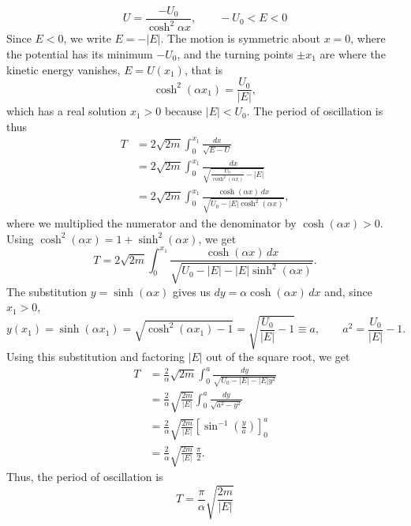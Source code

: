 \begin{subproblem}
{
\begin{equation*}
    U = \frac{-U_0}{\cosh^2{\alpha x}}, \qquad -U_0 < E < 0
\end{equation*}
}
{
Since $E<0$, we write $E=-|E|$. The motion is symmetric about $x=0$, where the potential has its minimum $-U_0$, and the turning points $\pm x_1$ are where the kinetic energy vanishes, $E = U(x_1)$, that is
\begin{equation*}
    \cosh^2{(\alpha x_1)} = \frac{U_0}{|E|},
\end{equation*}
which has a real solution $x_1>0$ because $|E|<U_0$. The period of oscillation is thus
\begin{align*}
    T &= 2\sqrt{2m} \int_0^{x_1}\frac{dx}{\sqrt{E-U}} \\
    &= 2\sqrt{2m} \int_0^{x_1}\frac{dx}{\sqrt{\frac{U_0}{\cosh^2{(\alpha x)}}-|E|}} \\
    &= 2\sqrt{2m} \int_0^{x_1}\frac{\cosh{(\alpha x)}\,dx}{\sqrt{U_0-|E|\cosh^2{(\alpha x)}}},
\end{align*}
where we multiplied the numerator and the denominator by $\cosh{(\alpha x)}>0$. Using $\cosh^2{(\alpha x)} = 1 + \sinh^2{(\alpha x)}$, we get
\begin{equation*}
    T = 2\sqrt{2m} \int_0^{x_1}\frac{\cosh{(\alpha x)}\,dx}{\sqrt{U_0-|E|-|E|\sinh^2{(\alpha x)}}}.
\end{equation*}
The substitution $y=\sinh{(\alpha x)}$ gives us $dy = \alpha\cosh{(\alpha x)}\,dx$ and, since $x_1>0$,
\begin{equation*}
    y(x_1) = \sinh{(\alpha x_1)} = \sqrt{ \cosh^2{(\alpha x_1)} - 1 } = \sqrt{\frac{U_0}{|E|} - 1} \equiv a,
    \qquad a^2 = \frac{U_0}{|E|} - 1 .
\end{equation*}
Using this substitution and factoring $|E|$ out of the square root, we get
\begin{align*}
    T &= \frac{2}{\alpha}\sqrt{2m} \int_0^{a} \frac{dy}{\sqrt{U_0-|E|-|E|y^2}} \\
    &= \frac{2}{\alpha}\sqrt{\frac{2m}{|E|}} \int_0^{a} \frac{dy}{\sqrt{a^2-y^2}} \\
    &= \frac{2}{\alpha}\sqrt{\frac{2m}{|E|}} \left[\sin^{-1}{\left(\frac{y}{a}\right)}\right]_0^a \\
    &= \frac{2}{\alpha}\sqrt{\frac{2m}{|E|}}\,\frac{\pi}{2}.
\end{align*}
Thus, the period of oscillation is
}
{
\begin{equation*}
    T = \frac{\pi}{\alpha}\sqrt{\frac{2m}{|E|}}
\end{equation*}
}
\end{subproblem}

